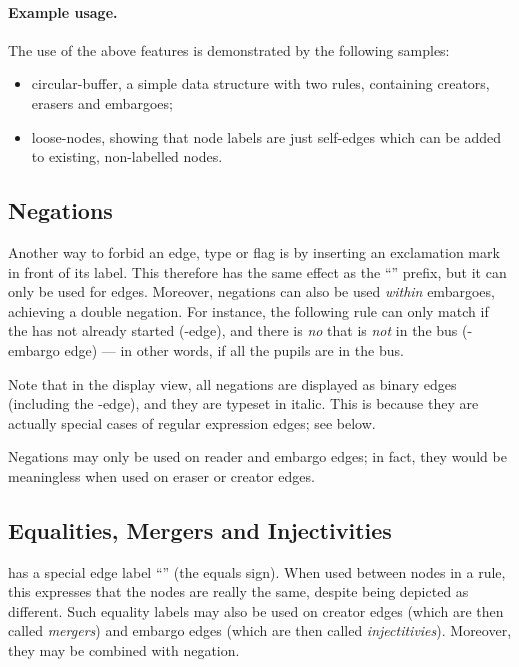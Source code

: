 \paragraph{Example usage.}

The use of the above features is demonstrated by the following \GROOVE samples:
%
\begin{itemize}[noitemsep]
\item \textsf{circular-buffer}, a simple data structure with two rules,
  containing creators, erasers and embargoes;
\item \textsf{loose-nodes}, showing that node labels are just self-edges which
  can be added to existing, non-labelled nodes.
\end{itemize}

\subsection{Negations}

Another way to forbid an edge, type or flag is by inserting an exclamation mark
in front of its label. This therefore has the same effect as the ``\notP''
prefix, but it can only be used for edges. Moreover, negations can also be used
\emph{within} embargoes, achieving a double negation. For instance, the
following rule can only match if the  has not already started
(-edge), and there is \emph{no}  that is
\emph{not} in the bus (-embargo edge) --- in other words, if all the
pupils are in the bus.

Note that in the display view, all negations are displayed as binary edges
(including the -edge), and they are typeset in italic. This
is because they are actually special cases of regular expression edges; see
 below.


Negations may only be used on reader and embargo edges; in fact, they would be
meaningless when used on eraser or creator edges.

\subsection{Equalities, Mergers and Injectivities}

\GROOVE{} has a special edge label ``\lab{=}'' (the equals sign). When used
between nodes in a rule, this expresses that the nodes are really the same,
despite being depicted as different. Such equality labels may also be used on
creator edges (which are then called \emph{mergers}) and embargo edges (which
are then called \emph{injectitivies}). Moreover, they may be combined with
negation.

